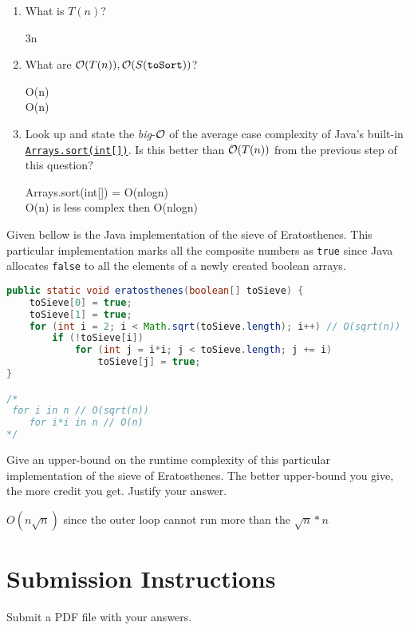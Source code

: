 \documentclass{homework}
\begin{document}
\begin{enumerate}
  \item What is $T(n)$?

        \begin{sol}
          3n
        \end{sol}

  \item What are $\mathcal{O}(T(n)), \mathcal{O}(S(\texttt{toSort}))$?

        \begin{sol}
          O(n) \\
          O(n)
        \end{sol}

  \item Look up and state the \textit{big}-$\mathcal{O}$ of the average case
        complexity of Java's built-in
        \href{https://tinyurl.com/jw75mfa}{\texttt{Arrays.sort(int[])}}.
        Is this better than $\mathcal{O}(T(n))$ from the previous step of this question?

        \begin{sol}
          Arrays.sort(int[]) = O(nlogn) \\
          O(n) is less complex then O(nlogn)
        \end{sol}
\end{enumerate}

\question Given bellow is the Java implementation of the sieve of
Eratosthenes. This particular implementation marks all the
composite numbers as \texttt{true} since Java allocates
\texttt{false} to all the elements of a newly created boolean
arrays.
\begin{lstlisting}[language=java]
public static void eratosthenes(boolean[] toSieve) {
    toSieve[0] = true;
    toSieve[1] = true;
    for (int i = 2; i < Math.sqrt(toSieve.length); i++) // O(sqrt(n))
        if (!toSieve[i])
            for (int j = i*i; j < toSieve.length; j += i)
                toSieve[j] = true;
}

/*
 for i in n // O(sqrt(n))
    for i*i in n // O(n) 
*/
\end{lstlisting}
Give an upper-bound on the runtime complexity of this particular
implementation of the sieve of Eratosthenes. The better
upper-bound you give, the more credit you get. Justify your
answer.

\begin{sol} 
  $O(n\sqrt{n})$ since the outer loop cannot run more than the $\sqrt{n} * n$
\end{sol}

\section*{Submission Instructions}
Submit a PDF file with your answers.
\end{document}
